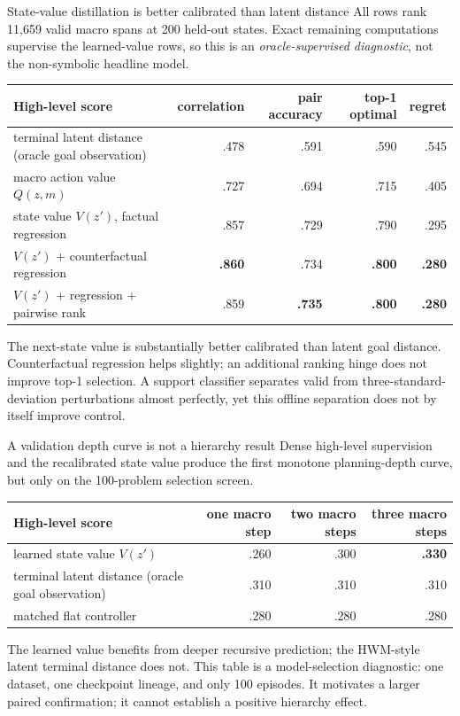 \documentclass[aspectratio=169,10pt]{beamer}
\newcommand{\good}[1]{\textcolor{cgreen}{\textbf{#1}}}
\begin{document}
\begin{frame}{State-value distillation is better calibrated than latent distance}
\footnotesize
All rows rank 11,659 valid macro spans at 200 held-out states. Exact remaining
computations supervise the learned-value rows, so this is an
\emph{oracle-supervised diagnostic}, not the non-symbolic headline model.

\medskip
\centering
\begin{tabular}{lrrrr}
\toprule
High-level score & correlation & pair accuracy & top-1 optimal & regret\\
\midrule
terminal latent distance (oracle goal observation) & .478 & .591 & .590 & .545\\
macro action value $Q(z,m)$ & .727 & .694 & .715 & .405\\
state value $V(z')$, factual regression & .857 & .729 & .790 & .295\\
$V(z')$ + counterfactual regression & \good{.860} & .734 & \good{.800} & \good{.280}\\
$V(z')$ + regression + pairwise rank & .859 & \good{.735} & \good{.800} & \good{.280}\\
\bottomrule
\end{tabular}

\medskip
The next-state value is substantially better calibrated than latent goal
distance. Counterfactual regression helps slightly; an additional ranking
hinge does not improve top-1 selection. A support classifier separates valid
from three-standard-deviation perturbations almost perfectly, yet this offline
separation does not by itself improve control.
\end{frame}

\begin{frame}{A validation depth curve is not a hierarchy result}
\footnotesize
Dense high-level supervision and the recalibrated state value produce the
first monotone planning-depth curve, but only on the 100-problem selection
screen.

\medskip
\centering
\begin{tabular}{lrrr}
\toprule
High-level score & one macro step & two macro steps & three macro steps\\
\midrule
learned state value $V(z')$ & .260 & .300 & \good{.330}\\
terminal latent distance (oracle goal observation) & .310 & .310 & .310\\
matched flat controller & .280 & .280 & .280\\
\bottomrule
\end{tabular}

\medskip
The learned value benefits from deeper recursive prediction; the HWM-style
latent terminal distance does not. This table is a model-selection diagnostic:
one dataset, one checkpoint lineage, and only 100 episodes. It motivates a
larger paired confirmation; it cannot establish a positive hierarchy effect.
\end{frame}
\end{document}
